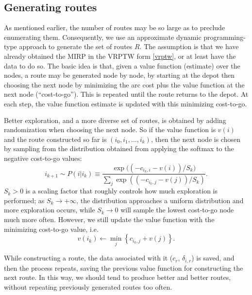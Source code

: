 \documentclass[11pt]{article}
\theoremstyle{definition}
\newcommand{\set}[1]{\left\{ #1 \right\}}
\newcommand{\smallsum}{{\textstyle{\sum}}}
\newcommand{\0}{\mathbf{0}}
\begin{document}
\subsection{Generating routes}

As mentioned earlier, the number of routes may be so large as to preclude enumerating them.
Consequently, we use an approximate dynamic programming-type approach to generate the set of routes $R$.
The assumption is that we have already obtained the MIRP in the VRPTW form \eqref{vrptw}, or at least have the data to do so.
The basic idea is that, given a value function (estimate) over the nodes, a route may be generated node by node, by starting at the depot then choosing the next node by minimizing the arc cost plus the value function at the next node (``cost-to-go'').
This is repeated until the route returns to the depot.
At each step, the value function estimate is updated with this minimizing cost-to-go.

Better exploration, and a more diverse set of routes, is obtained by adding randomization when choosing the next node.
So if the value function is $v(i)$ and the route constructed so far is $(i_0,i_1,\dots, i_k)$, then the next node is chosen by sampling from the distribution obtained from applying the softmax to the negative cost-to-go values:
\[
i_{k+1} \sim P(i | i_k) \equiv \frac{\exp\big( (-c_{i_k,i} - v(i))/S_k \big)}{\smallsum_j \exp((-c_{i_k,j} - v(j))/S_k)}.
\]
$S_k > 0$ is a scaling factor that roughly controls how much exploration is performed;
as $S_k \to +\infty$, the distribution approaches a uniform distribution and more exploration occurs,
while $S_k \to 0$ will sample the lowest cost-to-go node much more often.
However, we still update the value function with the minimizing cost-to-go value, i.e. 
\[
	v(i_k) \gets \min_j \set{ c_{i_k,j} + v(j) }.
\]

While constructing a route, the data associated with it ($c_r$, $\delta_{i,r}$) is saved, and then the process repeats, saving the previous value function for constructing the next route.
In this way, we should tend to produce better and better routes, without repeating previously generated routes too often.


\end{document}
